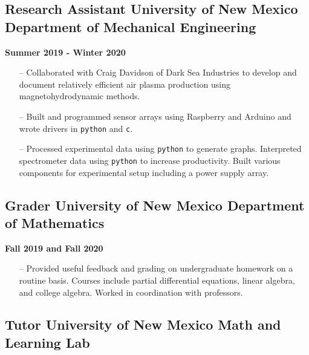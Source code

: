 \documentclass{article}
\begin{document}
\subsection*{Research Assistant \textbar{} University of New Mexico
Department of Mechanical
Engineering}\label{research-assistant-university-of-new-mexico-department-of-mechanical-engineering}

\textbf{Summer 2019 - Winter 2020}

\begin{itemize}
\tightlist
\item[--]
  Collaborated with Craig Davidson of Dark Sea Industries to develop and
  document relatively efficient air plasma production using
  magnetohydrodynamic methods.
\item[--]
  Built and programmed sensor arrays using Raspberry and Arduino and
  wrote drivers in \texttt{python} and \texttt{c}.
\item[--]
  Processed experimental data using \texttt{python} to generate graphs.
  Interpreted spectrometer data using \texttt{python} to increase productivity.
  Built various components for experimental setup including a power
  supply array.
\end{itemize}

\subsection*{Grader \textbar{} University of New Mexico Department of
Mathematics}\label{grader-university-of-new-mexico-department-of-mathematics}

\textbf{Fall 2019 and Fall 2020}

\begin{itemize}
\tightlist
\item[--]
  Provided useful feedback and grading on undergraduate homework on a
  routine basis. Courses include partial differential equations, linear
  algebra, and college algebra. Worked in coordination with professors.
\end{itemize}

\subsection*{Tutor \textbar{} University of New Mexico Math and Learning
Lab}\label{tutor-university-of-new-mexico-math-and-learning-lab}
\end{document}
